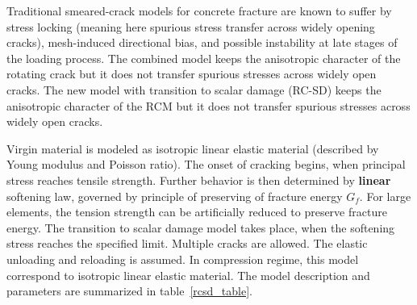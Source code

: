 \documentclass[epsf,a4paper]{article}
\begin{document}
Traditional smeared-crack models for concrete fracture are known to suffer by stress locking (meaning here spurious stress transfer across widely opening cracks),
mesh-induced directional bias, and possible instability at late stages of the loading process.
The combined model keeps the anisotropic character of the rotating
crack but it does not transfer spurious stresses across
widely open cracks.
The new model with transition to
scalar damage (RC-SD) keeps the anisotropic character of the RCM but
it does not transfer spurious stresses across widely open cracks.

Virgin material is modeled as isotropic linear elastic material
(described by Young modulus and Poisson
ratio). The onset of cracking begins, when principal stress reaches
tensile strength. 
Further behavior is then determined by {\bf linear} softening law, 
governed by principle of preserving of fracture
energy $G_f$. For large elements, the tension strength can be
artificially reduced
to preserve fracture energy.  The transition to scalar damage model
takes place, when the softening stress reaches the specified limit.
Multiple cracks are allowed. 
The elastic unloading and reloading is assumed. 
In compression regime, this model correspond to isotropic linear elastic material.
The model description and parameters are summarized
in table~\ref{rcsd_table}.
\end{document}
